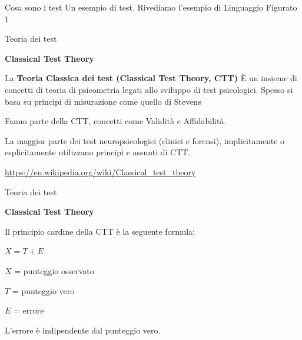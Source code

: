 \documentclass[
  ignorenonframetext,
]{beamer}
\begin{document}
\begin{frame}{Cosa sono i test}
\label{cosa-sono-i-test-3}
Un esempio di test. Rivediamo l'esempio di Linguaggio Figurato 1
\end{frame}

\begin{frame}{Teoria dei test}
\label{teoria-dei-test}
\begin{center}
  \textbf{Classical Test Theory}
\end{center}

La \textbf{Teoria Classica dei test (Classical Test Theory, CTT)} È un
insieme di concetti di teoria di psicometria legati allo sviluppo di
test psicologici. Spesso si basa su principi di misurazione come quello
di Stevens \pause

Fanno parte della CTT, concetti come Validità e Affidabilità. \pause

La maggior parte dei test neuropsicologici (clinici e forensi),
implicitamente o esplicitamente utilizzano principi e assunti di CTT.

\url{https://en.wikipedia.org/wiki/Classical_test_theory}
\end{frame}

\begin{frame}{Teoria dei test}
\label{teoria-dei-test-1}
\begin{center}
  \textbf{Classical Test Theory}
\end{center}

Il principio cardine della CTT è la seguente formula:

\begin{center}
$X = T + E$
\end{center}
\pause

\(X\) = punteggio osservato

\(T\) = punteggio vero

\(E\) = errore \pause \vspace{1.5em}

L'errore è indipendente dal punteggio vero.
\end{frame}
\end{document}
